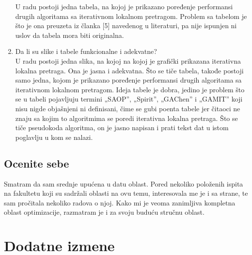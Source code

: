 \documentclass[a4paper]{report}
\begin{document}
\begin{enumerate}
U radu postoji jedna tabela, na kojoj je prikazano poređenje performansi drugih algoritama sa iterativnom lokalnom pretragom. Problem sa tabelom je što je ona preuzeta iz članka [5] navedenog u literaturi, pa nije ispunjen ni uslov da tabela mora biti originalna.

\item Da li su slike i tabele funkcionalne i adekvatne?\\
U radu postoji jedna slika, na kojoj na kojoj je grafički prikazana iterativna lokalna pretraga. Ona je jasna i adekvatna. Što se tiče tabela, takođe postoji samo jedna, kojom je prikazano poređenje performansi drugih algoritama sa iterativnom lokalnom pretragom. Ideja tabele je dobra, jedino je problem što se u tabeli pojavljuju termini „SAOP”, „Spirit”, „GAChen” i „GAMIT” koji nisu nigde objašnjeni ni definisani, čime se gubi poenta tabele jer čitaoci ne znaju sa kojim to algoritmima se poredi iterativna lokalna pretraga. Što se tiče pseudokoda algoritma, on je jasno napisan i prati tekst dat u istom poglavlju u kom se nalazi.
\end{enumerate}

\section{Ocenite sebe}

Smatram da sam srednje upućena u datu oblast. Pored nekoliko položenih  ispita na fakultetu koji su sadržali oblasti na ovu temu, interesovala me je i sa strane, te sam pročitala nekoliko radova o njoj. Kako mi je veoma zanimljiva kompletna oblast optimizacije, razmatram je i za svoju buduću stručnu oblast. 





\chapter{Dodatne izmene}
\end{document}
